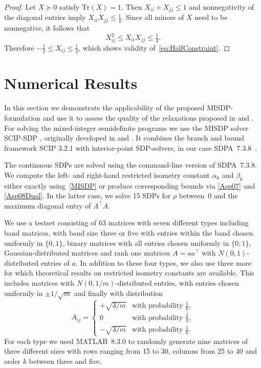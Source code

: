 \documentclass[journal]{IEEEtran}
\newcommand{\T}{^{\top}}
\newcommand{\Tr}{\text{Tr}}
\newcommand{\comment}[1]{\marginpar{\raggedright\tiny {#1}}}
\begin{document}
\begin{proof}
  Let $X \succeq 0$ satisfy $\Tr(X)=1$. Then $X_{ii}+X_{jj}\leq 1$ and
  nonnegativity of the diagonal entries imply $X_{ii}X_{jj}\leq
  \tfrac{1}{4}$.  Since all minors of $X$ need to be nonnegative, it
  follows that
  \begin{equation*}
    X_{ij}^2 \leq  X_{ii} X_{jj} \leq \tfrac{1}{4}.
  \end{equation*}
  Therefore $- \tfrac{1}{2} \leq X_{ij} \leq \tfrac{1}{2}$, which shows
  validity of~\eqref{eq:HalfConstraint}.
\end{proof}


\section{Numerical Results}
\label{sec:numerical_results}

\noindent
In this section we demonstrate the applicability of the proposed MISDP-formulation and use it to
assess the quality of the relaxations proposed in \cite{Asp08} and \cite{Asp07}.
For solving the mixed-integer semidefinite programs we use the MISDP solver SCIP-SDP \cite{SCIP-SDP},
originally developed in \cite{Mar13} and \cite{MS12}. It combines the
branch and bound framework SCIP 3.2.1 \cite{SCIP} with 
interior-point SDP-solvers, in our case SDPA~7.3.8~\cite{SDPA6,SDPA7}.

The continuous SDPs are solved using the command-line version of
SDPA~7.3.8. We compute the left- and right-hand restricted isometry
constant $\alpha_k$ and $\beta_k$ either exactly using~\eqref{MISDP} or
produce corresponding bounds via \eqref{Asp07} and \eqref{Asp08Dual}. In
the latter case, we solve 15 SDPs for $\rho$ between~$0$ and the maximum
diagonal entry of $A\T A$.\comment{As done in \cite{Asp08}?}

We use a testset consisting of 63 matrices with seven 
different types including band matrices, 
with band size three or five with entries within the band chosen uniformly in $\{0,1\}$, binary matrices with all entries chosen 
uniformly in $\{0,1\}$, Gaussian-distributed matrices and rank one 
matrices $A = aa\T$ with $N(0,1)$-distributed entries of $a$. In addition to these four types,
we also use three more for which theoretical results on restricted isometry
constants are available. This includes matrices with 
$N(0, 1/m)$-distributed entries, with entries chosen uniformly in $\pm 1/\sqrt{m}$ and finally with distribution
\begin{equation}\nonumber
  A_{ij} = \begin{cases}
    + \sqrt{3/m} & \text{with probability } \frac{1}{6}, \\
    0 & \text{with probability } \frac{2}{3}, \\
    - \sqrt{3/m} & \text{with probability } \frac{1}{6}.
  \end{cases}
\end{equation}
For each type we used \mbox{MATLAB 8.3.0} to randomly generate nine
matrices of three different sizes with rows ranging from 15 to 30, columns
from 25 to 40 and order $k$ between three and five.
\end{document}

